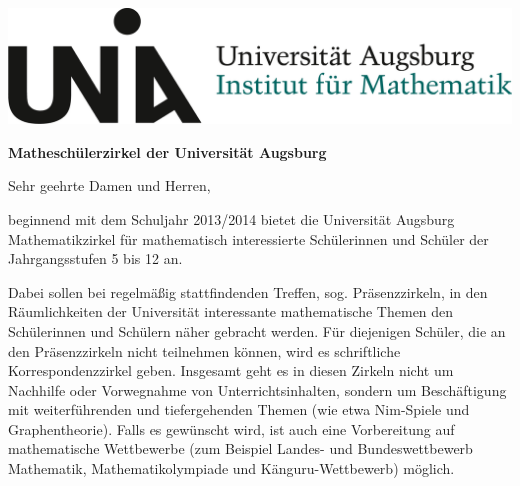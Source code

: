 \documentclass[a4paper,ngerman,12pt]{scrartcl}
\begin{document}
\includegraphics[scale=0.1,draft]{logo-ifm}

\setlength{\unitlength}{1cm}

\vspace{7cm}

\textbf{Matheschülerzirkel der Universität Augsburg}
\vspace{1em}

Sehr geehrte Damen und Herren,

beginnend mit dem Schuljahr 2013/2014 bietet die Universität Augsburg
Mathematikzirkel für mathematisch interessierte Schülerinnen und Schüler der
Jahrgangsstufen 5 bis 12 an.

Dabei sollen bei regelmäßig stattfindenden Treffen, sog. Präsenzzirkeln, in den
Räum\-lich\-kei\-ten der Universität interessante mathematische Themen den
Schülerinnen und Schülern näher gebracht werden. Für diejenigen Schüler, die an
den Präsenzzirkeln nicht teilnehmen können, wird es schriftliche
Korrespondenzzirkel geben. Insgesamt geht es in diesen Zirkeln nicht um
Nachhilfe oder Vorwegnahme von Unterrichtsinhalten, sondern um Beschäftigung
mit weiterführenden und tiefergehenden Themen (wie etwa Nim-Spiele und
Graphentheorie). Falls es gewünscht wird, ist auch eine Vorbereitung auf
mathematische Wettbewerbe (zum Beispiel Landes- und Bundeswettbewerb
Mathematik, Mathematikolympiade und Känguru-Wettbewerb) möglich. 
\end{document}
